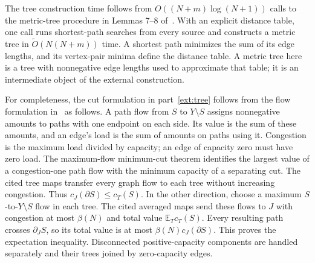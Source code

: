 \documentclass[11pt]{article}
\theoremstyle{definition}
\newcommand{\E}{\mathbb E}
\newcommand{\wt}{\widetilde}
\newcommand{\cut}{\partial}
\begin{document}
The tree construction time follows from $O((N+m)\log(N+1))$ calls to the
metric-tree procedure in Lemmas 7--8 of~\cite{Racke08}. With an explicit
distance table, one call runs shortest-path searches from every source
and constructs a metric tree in $\wt O(N(N+m))$ time. A shortest path
minimizes the sum of its edge lengths, and its vertex-pair minima define
the distance table. A metric tree here is a tree with nonnegative edge
lengths used to approximate that table; it is an intermediate object of
the external construction.

For completeness, the cut formulation in part~\ref{ext:tree} follows
from the flow formulation in~\cite{Racke08} as follows. A path flow from
$S$ to $Y\setminus S$ assigns nonnegative amounts to paths with one
endpoint on each side. Its value is the sum of these amounts, and an
edge's load is the sum of amounts on paths using it. Congestion is the
maximum load divided by capacity; an edge of capacity zero must have
zero load. The maximum-flow minimum-cut theorem identifies the largest
value of a congestion-one path flow with the minimum capacity of a
separating cut. The cited tree maps transfer every graph flow to each
tree without increasing congestion. Thus $c_J(\cut S)\le c_T(S)$.
In the other direction, choose a maximum $S$-to-$Y\setminus S$ flow
in each tree. The cited averaged maps send these flows to $J$ with
congestion at most $\beta(N)$ and total value $\E_Tc_T(S)$.
Every resulting path crosses $\cut_J S$, so its total value is at most
$\beta(N)c_J(\cut S)$. This proves the expectation inequality.
Disconnected positive-capacity components are handled separately and their
trees joined by zero-capacity edges.
\end{document}
